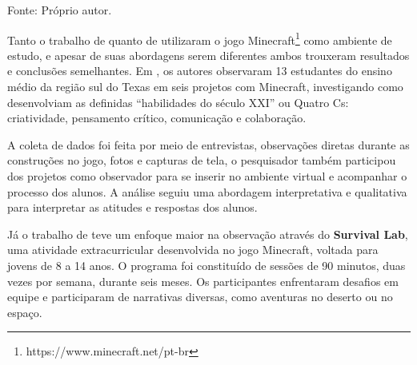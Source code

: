 \begin{table}[H]
\centering
\caption{Estudos experimentais com jogos multiplayer}
\label{tab:experimentos-educacionais}
\par
\vspace{2mm}
\footnotesize Fonte: Próprio autor.
\end{table}

Tanto o trabalho de  quanto de   utilizaram o jogo Minecraft\footnote{https://www.minecraft.net/pt-br} como ambiente de estudo, e apesar de suas abordagens serem diferentes ambos trouxeram resultados e conclusões semelhantes.
Em , os autores observaram 13 estudantes do ensino médio da região sul do Texas em seis projetos com Minecraft, investigando como desenvolviam as definidas ``habilidades do século XXI'' ou Quatro Cs: criatividade, pensamento crítico, comunicação e colaboração.

A coleta de dados foi feita por meio de entrevistas, observações diretas durante as construções no jogo, fotos e capturas de tela, o pesquisador também  participou dos projetos como observador para se inserir no ambiente virtual e acompanhar o processo dos alunos. A análise seguiu uma abordagem interpretativa e qualitativa para interpretar as atitudes e respostas dos alunos.

Já o trabalho de  teve um enfoque maior na observação através do \textbf{Survival Lab}, uma atividade extracurricular desenvolvida no jogo Minecraft, voltada para jovens de 8 a 14 anos. O programa foi constituído de sessões de 90 minutos, duas vezes por semana, durante seis meses. Os participantes enfrentaram desafios em equipe e participaram de narrativas diversas, como aventuras no deserto ou no espaço.

